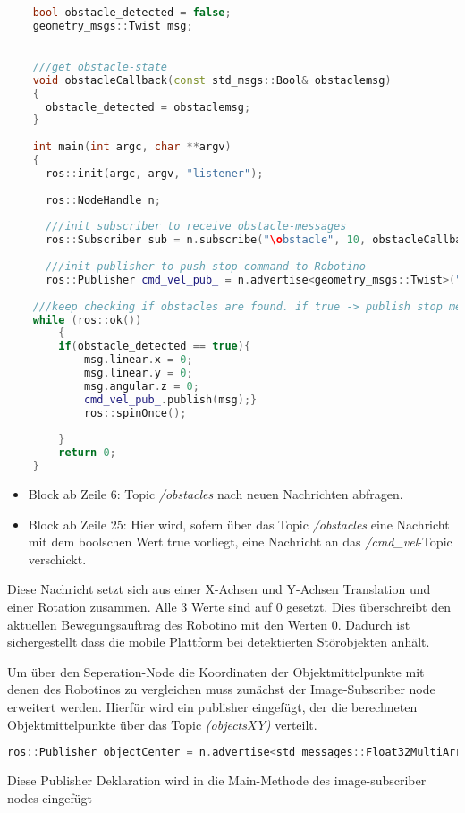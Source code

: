 	\newpage
	\begin{lstlisting}[language=C++]

	bool obstacle_detected = false;
	geometry_msgs::Twist msg;
	

	///get obstacle-state
	void obstacleCallback(const std_msgs::Bool& obstaclemsg)
	{
	  obstacle_detected = obstaclemsg;
	}
	
	int main(int argc, char **argv)
	{
	  ros::init(argc, argv, "listener");
	
	  ros::NodeHandle n;
	
      ///init subscriber to receive obstacle-messages
	  ros::Subscriber sub = n.subscribe("\obstacle", 10, obstacleCallback);
	
	  ///init publisher to push stop-command to Robotino
	  ros::Publisher cmd_vel_pub_ = n.advertise<geometry_msgs::Twist>("/cmd_vel", 1, true);
	
	///keep checking if obstacles are found. if true -> publish stop message
	while (ros::ok())
		{
		if(obstacle_detected == true){
			msg.linear.x = 0;
			msg.linear.y = 0;
			msg.angular.z = 0;
			cmd_vel_pub_.publish(msg);}
			ros::spinOnce();
	
		}
		return 0;
	}

	\end{lstlisting}
	
	\begin{itemize}
	\item Block ab Zeile 6: Topic \textit{/obstacles} nach neuen Nachrichten abfragen.
	\item Block ab Zeile 25: Hier wird, sofern über das Topic \textit{/obstacles} eine Nachricht mit dem boolschen Wert true vorliegt, eine Nachricht an das \textit{/cmd\_vel}-Topic verschickt.
	\end{itemize}
	 Diese Nachricht setzt sich aus einer X-Achsen und Y-Achsen Translation und einer Rotation zusammen. Alle 3 Werte sind auf 0 gesetzt. Dies überschreibt den aktuellen Bewegungsauftrag des Robotino mit den Werten 0. Dadurch ist sichergestellt dass die mobile Plattform bei detektierten Störobjekten anhält.
	 
	 Um über den Seperation-Node die Koordinaten der Objektmittelpunkte mit denen des Robotinos zu vergleichen muss zunächst der Image-Subscriber node erweitert werden. Hierfür wird ein publisher eingefügt, der die berechneten Objektmittelpunkte über das Topic \textit{(objectsXY)} verteilt.
	 \begin{lstlisting}[language = C++]	 
	 ros::Publisher objectCenter = n.advertise<std_messages::Float32MultiArray>("/objectsXY", 1, true);
 	 \end{lstlisting}
	 Diese Publisher Deklaration wird in die Main-Methode des image-subscriber nodes eingefügt
	 
